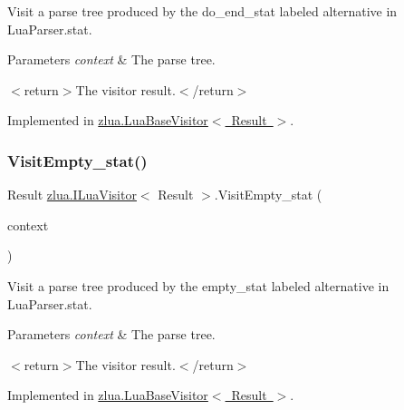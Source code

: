 Visit a parse tree produced by the {\ttfamily do\+\_\+end\+\_\+stat} labeled alternative in Lua\+Parser.\+stat. 


\begin{DoxyParams}{Parameters}
{\em context} & The parse tree.\\
\hline
\end{DoxyParams}
$<$return$>$The visitor result.$<$/return$>$ 

Implemented in \mbox{\hyperlink{classzlua_1_1_lua_base_visitor_aa97f734c7ba79e7b5ccde1506774e0ec}{zlua.\+Lua\+Base\+Visitor$<$ Result $>$}}.

\mbox{\label{interfacezlua_1_1_i_lua_visitor_a947d61d77abed1edc930be81be7c3e8f}} 
\subsubsection{\texorpdfstring{Visit\+Empty\+\_\+stat()}{VisitEmpty\_stat()}}
{\footnotesize\ttfamily Result \mbox{\hyperlink{interfacezlua_1_1_i_lua_visitor}{zlua.\+I\+Lua\+Visitor}}$<$ Result $>$.Visit\+Empty\+\_\+stat (\begin{DoxyParamCaption}\item[{\mbox{[}\+Not\+Null\mbox{]} \mbox{\hyperlink{classzlua_1_1_lua_parser_1_1_empty__stat_context}{Lua\+Parser.\+Empty\+\_\+stat\+Context}}}]{context }\end{DoxyParamCaption})}



Visit a parse tree produced by the {\ttfamily empty\+\_\+stat} labeled alternative in Lua\+Parser.\+stat. 


\begin{DoxyParams}{Parameters}
{\em context} & The parse tree.\\
\hline
\end{DoxyParams}
$<$return$>$The visitor result.$<$/return$>$ 

Implemented in \mbox{\hyperlink{classzlua_1_1_lua_base_visitor_af23710bf29c64a2976a48e6de8cae004}{zlua.\+Lua\+Base\+Visitor$<$ Result $>$}}.

\mbox{\label{interfacezlua_1_1_i_lua_visitor_a9fc764fe97efdcef87b716de7d157d72}} 
